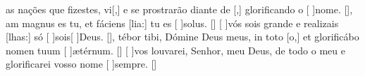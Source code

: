 {    { as nações que fizestes, vi[,] e se prostrarão diante de [,] glorificando o [ ]{no}me. [\LinkPT]},
  {am magnus es tu, et fáciens [lia:] tu es [ ]{so}lus. [\LinkLA]}%
    {[ ]{vós} sois grande e realizais [lhas:] só [ ]{sois}[ ]{Deus}. [\LinkPT]},
  {tébor tibi, Dómine Deus meus, in toto [o,] et glorificábo nomen tuum [ ]{æ}{tér}num. [\LinkLA]}%
    {[ ]{vos} louvarei, Senhor, meu Deus, de todo o meu  e glorificarei vosso nome [ ]{sem}pre. [\LinkPT]}
}